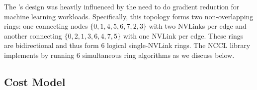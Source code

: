 
The \dgxone's design was heavily influenced by the need to do gradient reduction for machine learning workloads. Specifically, this topology forms two non-overlapping rings: one connecting nodes $\{0,1,4,5,6,7,2,3\}$ with two NVLinks per edge and another connecting $\{0,2,1,3,6,4,7,5\}$ with one NVLink per edge. These rings are bidirectional and thus form $6$ logical single-NVLink rings. The NCCL library implements \allgather by running $6$ simultaneous ring algorithms as we discuss below.


\subsection{Cost Model}

